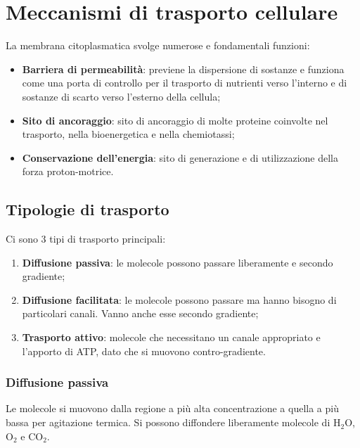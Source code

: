 \chapter{Meccanismi di trasporto cellulare}
La membrana citoplasmatica svolge numerose e fondamentali funzioni: 
\begin{itemize}
    \item \textbf{Barriera di permeabilit\`a}: previene la dispersione di sostanze e funziona come una porta di controllo per il trasporto di nutrienti verso l'interno e di sostanze di scarto verso l'esterno della cellula; 
    \item \textbf{Sito di ancoraggio}: sito di ancoraggio di molte proteine coinvolte nel trasporto, nella bioenergetica e nella chemiotassi; 
    \item \textbf{Conservazione dell'energia}: sito di generazione e di utilizzazione della forza proton-motrice.
\end{itemize}
\section{Tipologie di trasporto}
Ci sono 3 tipi di trasporto principali:
\begin{enumerate}
    \item \textbf{Diffusione passiva}: le molecole possono passare liberamente e secondo gradiente;
    \item \textbf{Diffusione facilitata}: le molecole possono passare ma hanno bisogno di particolari canali. Vanno anche esse secondo gradiente;
    \item \textbf{Trasporto attivo}: molecole che necessitano un canale appropriato e l'apporto di ATP, dato che si muovono contro-gradiente.
\end{enumerate}
\subsection{Diffusione passiva}
Le molecole si muovono dalla regione a pi\`u alta concentrazione a quella a pi\`u bassa per agitazione termica. Si possono diffondere liberamente molecole di H$_2$O, O$_2$ e CO$_2$. 
